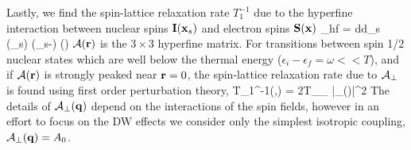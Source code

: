 \documentclass[prb,aps,showpacs,amsmath,twocolumn,10pt]{revtex4-1}
\begin{document}
Lastly, we find the spin-lattice relaxation rate $T_1^{-1}$ due to the
hyperfine interaction between nuclear spins ${\bf I}({\bf x}_s)$ and electron spins
${\bf S}({\bf x})$
\be
\cH_{hf} = \int d\vx d\vx_s \, \vI(\vx_s) \cdot { \cA}(\vx_s-\vx) \cdot \vS(\vx)
\ee
${ {\cal A}}({\bf r})$ is the $3\times 3$ hyperfine matrix. For transitions
between spin 1/2 nuclear states which are well below the thermal energy
($\epsilon_i-\epsilon_f=\omega<<T$), and if ${ {\cal A}}({\bf r})$ is strongly peaked near 
${\bf r}=0$, the spin-lattice relaxation rate due to ${{\cal A}}_{\perp}$ is
found using first order perturbation theory, \cite{nmr_abragam}
\be
\label{eq:rel_time}
T_1^{-1}(\vR,\omega) = 2T\lim\limits_{\omega{}}\sum\limits_{\vq}
\quad |\cA_{\perp}(\vq)|^2 
\ee
The details of ${\cal A}_{\perp}({\bf q})$ depend on the interactions of the spin
fields, however in an effort to focus on the DW effects we consider only the
simplest isotropic coupling, ${\cal A}_{\perp}({\bf q}) = A_0$. 

\end{document}
